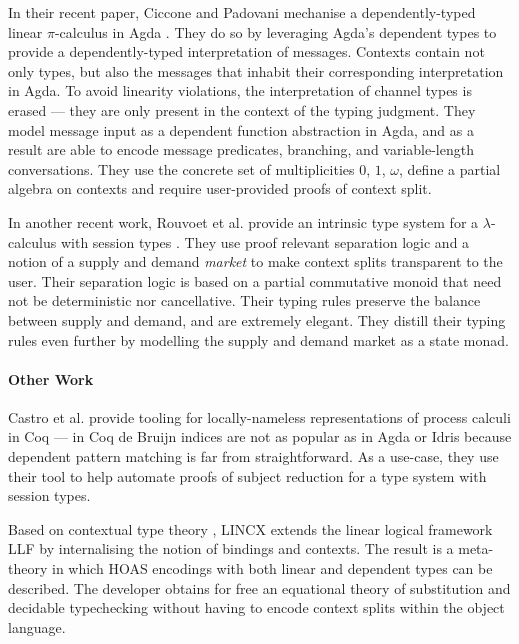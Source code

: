 \documentclass[sigplan,10pt,anonymous,review]{acmart}
\theoremstyle{definition}
\newcommand{\lambdacalc}{$\lambda$-calculus}
\newcommand{\picalc}{$\pi$-calculus}
\begin{document}
In their recent paper, Ciccone and Padovani mechanise a dependently-typed linear \picalc{} in Agda \cite{Ciccone}.
They do so by leveraging Agda's dependent types to provide a dependently-typed interpretation of messages.
Contexts contain not only types, but also the messages that inhabit their corresponding interpretation in Agda.
To avoid linearity violations, the interpretation of channel types is erased --- they are only present in the context of the typing judgment.
They model message input as a dependent function abstraction in Agda, and as a result are able to encode message predicates, branching, and variable-length conversations.
They use the concrete set of multiplicities $0$, $1$, $\omega$, define a partial algebra on contexts and require user-provided proofs of context split.

In another recent work, Rouvoet et al. provide an intrinsic type system for a \lambdacalc{} with session types \cite{Rouvoet2020}.
They use proof relevant separation logic and a notion of a supply and demand \emph{market} to make context splits transparent to the user.
Their separation logic is based on a partial commutative monoid that need not be deterministic nor cancellative.
Their typing rules preserve the balance between supply and demand, and are extremely elegant.
They distill their typing rules even further by modelling the supply and demand market as a state monad.

\paragraph{Other Work}

Castro et al. \cite{Castro2020} provide tooling for locally-nameless representations of process calculi in Coq  --- in Coq de Bruijn indices are not as popular as in Agda or Idris because dependent pattern matching is far from straightforward.
As a use-case, they use their tool to help automate proofs of subject reduction for a type system with session types.

Based on contextual type theory \cite{Pientkaa, Pientka}, LINCX \cite{Georges2017} extends the linear logical framework LLF \cite{Cervesato1996} by internalising the notion of bindings and contexts.
The result is a meta-theory in which HOAS encodings with both linear and dependent types can be described.
The developer obtains for free an equational theory of substitution and decidable typechecking without having to encode context splits within the object language.
\end{document}
